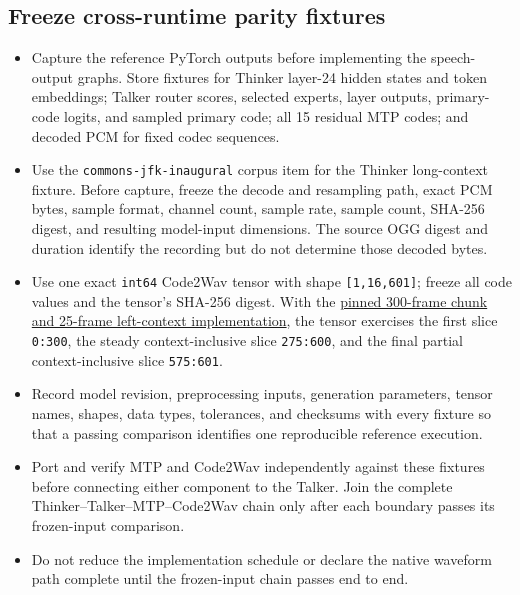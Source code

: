 \documentclass[10pt,letterpaper]{article}
\newcommand{\code}[1]{\texttt{#1}}
\begin{document}
\subsection{Freeze cross-runtime parity fixtures}
\begin{itemize}
    \item Capture the reference PyTorch outputs before implementing the speech-output graphs. Store fixtures for Thinker layer-24 hidden states and token embeddings; Talker router scores, selected experts, layer outputs, primary-code logits, and sampled primary code; all 15 residual MTP codes; and decoded PCM for fixed codec sequences.
    \item Use the \code{commons-jfk-inaugural} corpus item for the Thinker long-context fixture. Before capture, freeze the decode and resampling path, exact PCM bytes, sample format, channel count, sample rate, sample count, SHA-256 digest, and resulting model-input dimensions. The source OGG digest and duration identify the recording but do not determine those decoded bytes.
    \item Use one exact \code{int64} Code2Wav tensor with shape \code{[1,16,601]}; freeze all code values and the tensor's SHA-256 digest. With the \href{https://github.com/huggingface/transformers/blob/7d9754a05193eb79b1d86aa744b622b8068008cd/src/transformers/models/qwen3_omni_moe/modeling_qwen3_omni_moe.py\#L3505-L3515}{pinned 300-frame chunk and 25-frame left-context implementation}, the tensor exercises the first slice \code{0:300}, the steady context-inclusive slice \code{275:600}, and the final partial context-inclusive slice \code{575:601}.
    \item Record model revision, preprocessing inputs, generation parameters, tensor names, shapes, data types, tolerances, and checksums with every fixture so that a passing comparison identifies one reproducible reference execution.
    \item Port and verify MTP and Code2Wav independently against these fixtures before connecting either component to the Talker. Join the complete Thinker--Talker--MTP--Code2Wav chain only after each boundary passes its frozen-input comparison.
    \item Do not reduce the implementation schedule or declare the native waveform path complete until the frozen-input chain passes end to end.
\end{itemize}
\end{document}
